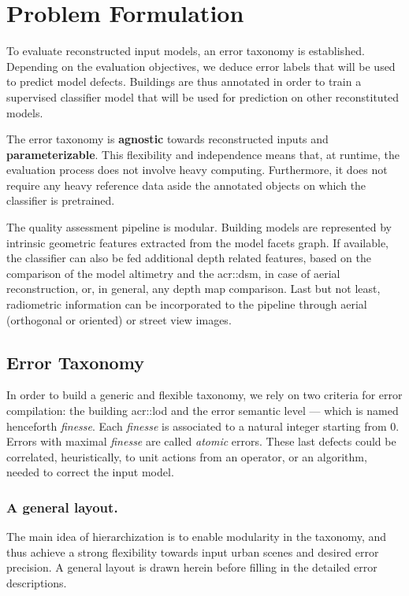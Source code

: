 \documentclass[runningheads]{llncs}
\begin{document}
\section{Problem Formulation}

To evaluate reconstructed input models, an error taxonomy is established. Depending on the evaluation objectives, we deduce error labels that will be used to predict model defects. Buildings are thus annotated in order to train a supervised classifier model that will be used for prediction on other reconstituted models.

The error taxonomy is \textbf{agnostic} towards reconstructed inputs and \textbf{parameterizable}. This flexibility and independence means that, at runtime, the evaluation process does not involve heavy computing. Furthermore, it does not require any heavy reference data aside the annotated objects on which the classifier is pretrained.

The quality assessment pipeline is modular. Building models are represented by intrinsic geometric features extracted from the model facets graph. If available, the classifier can also be fed additional depth related features, based on the comparison of the model altimetry and the \acrshort{acr::dsm}, in case of aerial reconstruction, or, in general, any depth map comparison. Last but not least, radiometric information can be incorporated to the pipeline through aerial (orthogonal or oriented) or street view images.

\subsection{Error Taxonomy}
In order to build a generic and flexible taxonomy, we rely on two criteria for error compilation: the building \acrshort{acr::lod} and the error semantic level --- which is named henceforth \textit{finesse}. Each \textit{finesse} is associated to a natural integer starting from $0$. Errors with maximal \textit{finesse} are called \textit{atomic} errors. These last defects could be correlated, heuristically, to unit actions from an operator, or an algorithm, needed to correct the input model.

\subsubsection{A general layout.}
The main idea of hierarchization is to enable modularity in the taxonomy, and thus achieve a strong flexibility towards input urban scenes and desired error precision. A general layout is drawn herein before filling in the detailed error descriptions.
\end{document}
